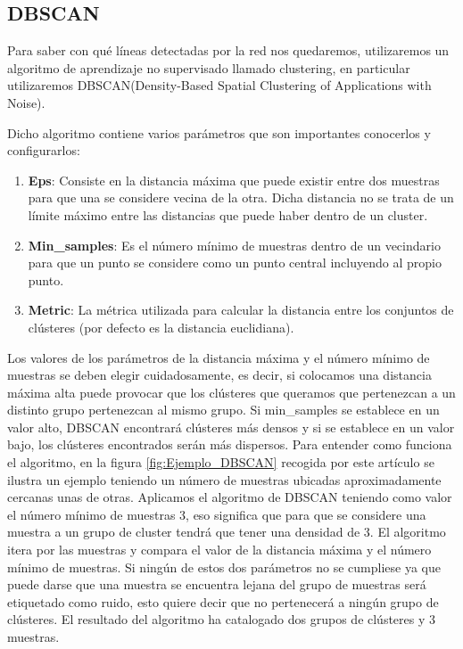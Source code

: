 \subsection{DBSCAN}
\label{sec:DBSCAN}

Para saber con qué líneas detectadas por la red nos quedaremos, utilizaremos un algoritmo de aprendizaje no supervisado llamado clustering, en particular
utilizaremos DBSCAN(Density-Based Spatial Clustering of Applications with Noise)\cite{ski_dbs}.\newline

Dicho algoritmo contiene varios parámetros que son importantes conocerlos y configurarlos: 
\begin{enumerate}
  \item \textbf{Eps}: Consiste en la distancia máxima que puede existir entre dos muestras para que una se considere vecina de la otra. Dicha distancia no se trata de un límite 
  máximo entre las distancias que puede haber dentro de un cluster.
  \item \textbf{Min\_samples}: Es el número mínimo de muestras dentro de un vecindario para que un punto se considere como un punto central incluyendo al propio punto.
  \item \textbf{Metric}: La métrica utilizada para calcular la distancia entre los conjuntos de clústeres (por defecto es la distancia euclidiana). 
\end{enumerate}
Los valores de los parámetros de la distancia máxima y el número mínimo de muestras se deben elegir cuidadosamente, es decir, si colocamos una distancia 
máxima alta puede provocar que los clústeres que queramos que pertenezcan a un distinto grupo pertenezcan al mismo grupo. 
Si min\_samples se establece en un valor alto, DBSCAN encontrará clústeres más densos y 
si se establece en un valor bajo, los clústeres encontrados serán más dispersos. \newline
Para entender como funciona el algoritmo, en la figura \ref{fig:Ejemplo_DBSCAN} recogida por este artículo\cite{DBSCAN} se ilustra 
un ejemplo teniendo un número de muestras ubicadas aproximadamente cercanas unas de otras. Aplicamos el algoritmo de DBSCAN 
teniendo como valor el número mínimo de muestras 3, eso significa que para que se considere una muestra a un grupo de cluster tendrá que tener una densidad de 3. El algoritmo itera por
las muestras y compara el valor de la distancia máxima y el número mínimo de muestras. 
Si ningún de estos dos parámetros no se cumpliese ya que puede darse que una muestra se encuentra lejana del grupo de muestras será etiquetado como ruido, esto quiere decir
que no pertenecerá a ningún grupo de clústeres. El resultado del algoritmo ha catalogado dos grupos de clústeres y 3 muestras. \newline

